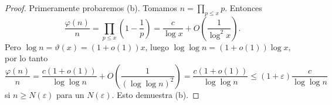 \documentclass[12pt,a4paper]{book}
\begin{document}
    \begin{proof}
        Primeramente probaremos (b). Tomamos $n=\prod_{p\leq x}p$. Entonces
        \begin{equation*}
            \frac{\varphi(n)}{n}=\prod_{p\leq x}\left(1-\frac{1}{p}\right)=\frac{c}{\log x}+O\left(\frac{1}{\log^{2}x}\right).
        \end{equation*}
        Pero $\log n=\vartheta(x)=(1+o(1))x$, luego $\log\log n=(1+o(1))\log x$, por lo tanto
        \begin{equation*}
            \frac{\varphi(n)}{n}=\frac{c(1+o(1))}{\log\log n}+O\left(\frac{1}{(\log\log n)^{2}}\right)=\frac{c(1+o(1))}{\log\log n}\leq(1+\varepsilon)\frac{c}{\log\log n}
        \end{equation*}
        si $n\geq N(\varepsilon)$ para un $N(\varepsilon)$. Esto demuestra (b).


\end{proof}
\end{document}
